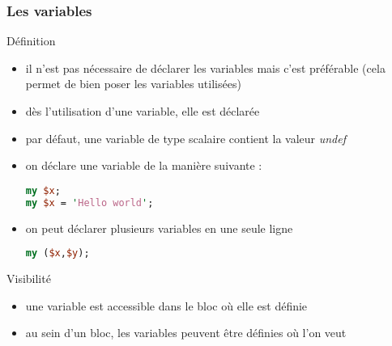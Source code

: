 \begin{frame}[fragile]
  \frametitle{Les variables}

  \begin{block}{Définition}
    \begin{itemize}
      \item il n'est pas nécessaire de déclarer les variables mais c'est
        préférable (cela permet de bien poser les variables utilisées)
      \item dès l'utilisation d'une variable, elle est déclarée
      \item par défaut, une variable de type scalaire contient la valeur
        \textit{undef}
      \item on déclare une variable de la manière suivante :
        \begin{lstlisting}[language=perl]
my $x;
my $x = 'Hello world';
        \end{lstlisting}
      \item on peut déclarer plusieurs variables en une seule ligne
        \begin{lstlisting}[language=perl]
my ($x,$y);
        \end{lstlisting}
    \end{itemize}
  \end{block}

  \begin{alertblock}{Visibilité}
    \begin{itemize}
    \item une variable est accessible dans le bloc où elle est définie
    \item au sein d'un bloc, les variables peuvent être définies où l'on veut
    \end{itemize}
  \end{alertblock}

\end{frame}


